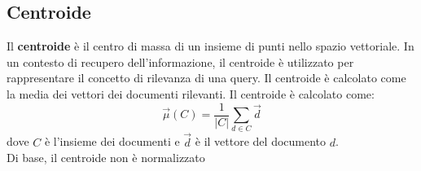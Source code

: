 \documentclass{report}
\begin{document}
	\subsection{Centroide}
	Il \textbf{centroide} è il centro di massa di un insieme di punti nello spazio vettoriale. In un contesto di recupero dell'informazione, il centroide è utilizzato per rappresentare il concetto di rilevanza di una query. Il centroide è calcolato come la media dei vettori dei documenti rilevanti. Il centroide è calcolato come:
	\[
	\overrightarrow{\mu}(C) = \frac{1}{|C|} \sum_{d \in C} \overrightarrow{d}
	\]
	dove \( C \) è l'insieme dei documenti e \( \overrightarrow{d} \) è il vettore del documento \( d \).
	\vspace{\baselineskip}\\
	Di base, il centroide non è normalizzato
\end{document}
